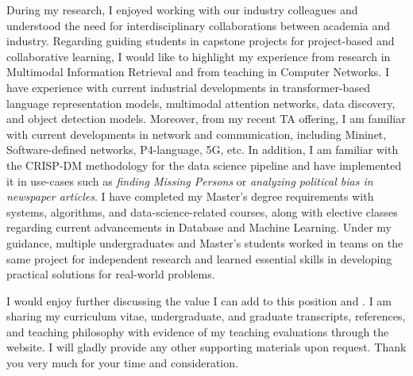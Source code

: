 \documentclass[10pt]{article}
\begin{document}
During my research, I enjoyed working with our industry colleagues and understood the need for interdisciplinary collaborations between academia and industry.
Regarding guiding students in capstone projects for project-based and collaborative learning, I would like to highlight my experience from research in Multimodal Information Retrieval and from teaching in Computer Networks. I have experience with current industrial developments in transformer-based language representation models, multimodal attention networks, data discovery, and object detection models. Moreover, from my recent TA offering, I am familiar with current developments in network and communication, including Mininet, Software-defined networks, P4-language, 5G, etc. In addition, I am familiar with the CRISP-DM methodology for the data science pipeline and have implemented it in use-cases such as \textit{finding Missing Persons} or \textit{analyzing political bias in newspaper articles}. 
I have completed my Master's degree requirements with systems, algorithms, and data-science-related courses, along with elective classes regarding current advancements in Database and Machine Learning. 
Under my guidance, multiple undergraduates and Master's students worked in teams on the same project for independent research and learned essential skills in developing practical solutions for real-world problems.  



I would enjoy further discussing the value I can add to this position and \InstitutionName{}. I am sharing my 
curriculum vitae, 
undergraduate, and graduate transcripts,  
references,
and teaching philosophy
with evidence of my teaching evaluations 
through the website. 
I will gladly provide any other supporting materials upon request. Thank you very much for your time and consideration.\\
\end{document}

